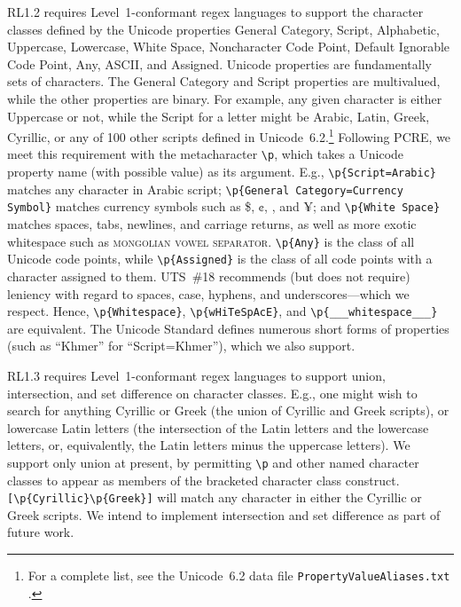 \documentclass[5p,final,number,sort&compress]{elsarticle}
\newcommand{\re}[1]{\texttt{#1}}
\newcommand*{\whack}{\textbackslash}
\begin{document}
RL1.2 requires Level~1-conformant regex languages to support the character classes defined by the Unicode properties General Category, Script, Alphabetic, Uppercase, Lowercase, White Space, Noncharacter Code Point, Default Ignorable Code Point, Any, ASCII, and Assigned. Unicode properties are fundamentally sets of characters. The General Category and Script properties are multivalued, while the other properties are binary. For example, any given character is either Uppercase or not, while the Script for a letter might be Arabic, Latin, Greek, Cyrillic, or any of 100 other scripts defined in Unicode~6.2.\footnote{For a complete list, see the Unicode~6.2 data file \texttt{PropertyValueAliases.txt} \citep{ustd62}.} Following PCRE, we meet this requirement with the metacharacter \re{\whack p}, which takes a Unicode property name (with possible value) as its argument. E.g., \re{\whack p\{Script=Arabic\}} matches any character in Arabic script; \re{\whack p\{General Category=Currency Symbol\}} matches currency symbols such as \$, ¢, \texteuro, and ¥; and \re{\whack p\{White Space\}} matches spaces, tabs, newlines, and carriage returns, as well as more exotic whitespace such as \textsc{mongolian vowel separator}.  \re{\whack p\{Any\}} is the class of all Unicode code points, while \re{\whack p\{Assigned\}} is the class of all code points with a character assigned to them. UTS~\#18 recommends (but does not require) leniency with regard to spaces, case, hyphens, and underscores---which we respect. Hence, \re{\whack p\{Whitespace\}}, \re{\whack p\{wHiTeSpAcE\}}, and \re{\whack p\{\_\_\_white\;\;\;\;space\_\_\_\}} are equivalent. The Unicode Standard defines numerous short forms of properties (such as ``Khmer'' for ``Script=Khmer''), which we also support.

RL1.3 requires Level~1-conformant regex languages to support union, intersection, and set difference on character classes. E.g., one might wish to search for anything Cyrillic or Greek (the union of Cyrillic and Greek scripts), or lowercase Latin letters (the intersection of the Latin letters and the lowercase letters, or, equivalently, the Latin letters minus the uppercase letters). We support only union at present, by permitting \re{\whack p} and other named character classes to appear as members of the bracketed character class construct. \re{[\whack p\{Cyrillic\}\whack p\{Greek\}]} will match any character in either the Cyrillic or Greek scripts. We intend to implement intersection and set difference as part of future work. 
\end{document}
